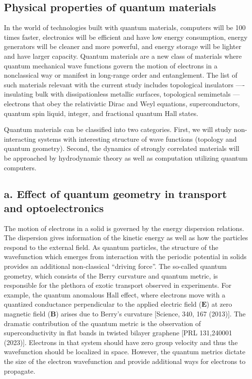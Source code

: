 \documentclass[a4paper,11pt]{article}
\begin{document}
\subsection*{Physical properties of quantum materials}
In the world of technologies built with quantum materials, computers
will be 100 times faster, electronics will be efficient and have
low energy consumption, energy generators will be cleaner and more
powerful, and energy storage will be lighter and have larger capacity.
Quantum materials are a new class of materials where quantum
mechanical wave functions govern the motion of electrons in a
nonclassical way or manifest in long-range order and
entanglement. The list of such materials relevant with the current
study includes topological insulators ---- insulating bulk with
dissipationless metallic surfaces, topological semimetals ---
electrons that obey the relativistic Dirac and Weyl equations,
superconductors, quantum spin liquid, integer, and fractional quantum
Hall states.

Quantum materials can be classified into two categories.  First, we
will study non-interacting systems with interesting structure of
wave functions (topology and quantum geometry). Second, the dynamics
of strongly correlated materials will be approached by hydrodynamic
theory as well as computation utilizing quantum computers.

\subsection*{a. Effect of quantum geometry in transport and optoelectronics}
The motion of electrons in a solid is governed by the energy dispersion
relations. The dispersion gives information of the kinetic energy as
well as how the particles respond to the external field. As quantum
particles, the structure of the wavefunction which emerges from
interaction with the periodic potential in solids provides an additional
non-classical ``driving force''. The so-called quantum geometry, which consists of the Berry curvature and quantum metric, is responsible for
the plethora of exotic transport observed in experiments. For example,
the quantum anomalous Hall effect, where electrons move with a
quantized conductance perpendicular to the applied electric field
($\mathbf{E}$) at zero magnetic field ($\mathbf{B}$) arises due to Berry's curvature [Science, 340, 167 (2013)]. The dramatic
contribution of the quantum metric is the observation of superconductivity
in flat bands in twisted bilayer graphene [PRL 131,240001
  (2023)]. Electrons in that system should have zero group velocity
and thus the wavefunction should be localized in space. However, the
quantum metrics dictate the size of the electron wavefunction and provide
additional ways for electrons to propagate.
\end{document}
